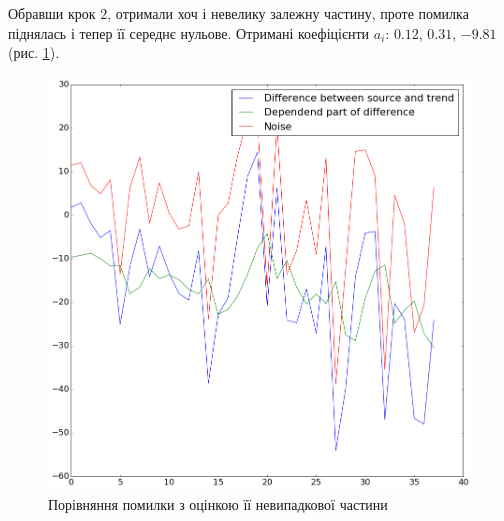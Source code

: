 Обравши крок $2$, отримали хоч і невелику залежну частину,
проте помилка піднялась і тепер її середнє нульове.
Отримані коефіцієнти $a_i$: $0.12$, $0.31$, $-9.81$
(рис. \ref{fig:error:fixed}).
\begin{figure}[h!]
  \centering
  \includegraphics[width=\textwidth]{Coursework_files/Coursework_33_0.png}
  \caption{Порівняння помилки з оцінкою її невипадкової частини}
  \label{fig:error:fixed}
\end{figure}

